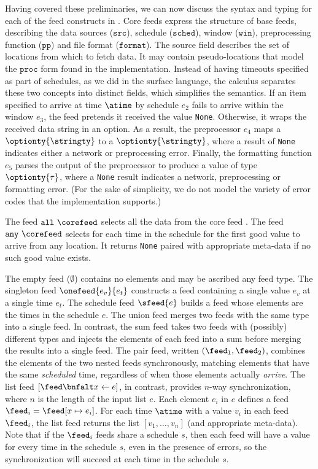 Having covered these preliminaries, 
we can now discuss the syntax and typing for
each of the feed constructs in . 
Core feeds express the structure of base feeds, describing
the data sources ($\mathtt{src}$), schedule ($\mathtt{sched}$), window
($\mathtt{win}$), preprocessing function ($\mathtt{pp}$) and file
format ($\mathtt{format}$).  The source field describes the set of
locations from which to fetch data.  It may contain
pseudo-locations that model the $\mathtt{proc}$ form found in the
implementation.  Instead of having timeouts specified as part of
schedules, as we did in the surface language, the calculus separates
these two concepts into distinct fields, which simplifies the semantics.
If an item specified to arrive at time $\atime$ by schedule $e_2$ fails
to arrive within the window $e_3$, the feed pretends it received the
value \texttt{None}.  Otherwise, it wraps the received data string in
an option. As a result, the preprocessor $e_4$ maps a $\optionty{\stringty}$
to a $\optionty{\stringty}$, where a result of \texttt{None} indicates
either a network or preprocessing error.  Finally, the formatting
function $e_5$ parses the output of the preprocessor to produce a 
value of type $\optionty{\tau}$, where a \texttt{None} result
indicates a network, preprocessing or formatting error. (For the sake
of simplicity, we do not model the variety of error codes that the
implementation supports.)  

The feed $\mathtt{all}\ \corefeed$ selects all the data from the core
feed \corefeed.  The feed $\mathtt{any}\ \corefeed$ selects for each
time in the schedule for \corefeed{} the first good value to arrive
from any location.  It returns \texttt{None} paired with appropriate
meta-data if no such good value exists.

The empty feed ($\emptyset$) contains no elements and may be ascribed
any feed type.  The singleton feed $\onefeed{e_v}{e_t}$
constructs a feed containing a single value $e_v$ at a single time
$e_t$.  The schedule feed $\sfeed{e}$ builds a feed whose elements 
are the times in the schedule $e$.
The union feed merges two feeds with the same type
into a single feed.  In contrast, the sum feed takes two feeds
with (possibly) different types and injects the elements of each feed
into a sum before merging the results into a single feed.  
The pair feed, written $(\feed_1, \feed_2)$, combines the elements of
the two nested feeds synchronously, matching elements that have the
same {\em scheduled} time, regardless of when those elements
actually {\em arrive}.
The list feed $[\feed \bnfalt x \leftarrow e ]$, in contrast, provides
$n$-way synchronization, where $n$ is the length of the input list
$e$.  Each element $e_i$ in $e$ defines a feed $\feed_i = \feed[x \mapsto e_i]$.
For each time $\atime$ with a value $v_i$ in each feed $\feed_i$, the
list feed returns the list $[v_1, \ldots, v_n]$ (and appropriate meta-data).  Note that if the
$\feed_i$ feeds share a schedule $s$, then each feed will have a value
for every time in the schedule $s$, even in the presence of errors, so
the synchronization will succeed at each time in the schedule $s$.

